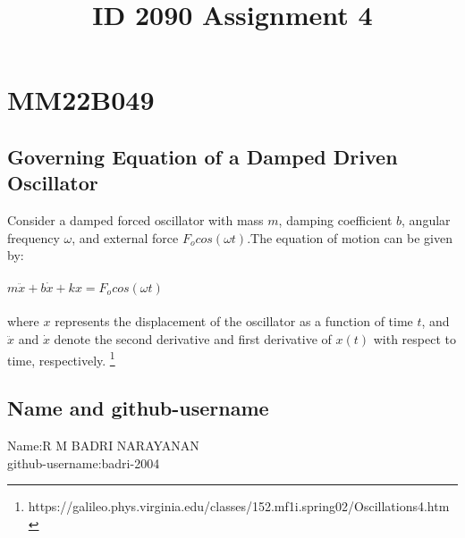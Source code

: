 \documentclass{article}
\title{ID 2090 Assignment 4}
\begin{document}
\section{MM22B049}
\subsection{Governing Equation of a Damped Driven Oscillator}
Consider a damped forced oscillator with mass $m$, damping coefficient $b$, angular frequency $\omega$, and external force \(F_ocos(\omega t)\).The equation of motion can be given by:\\\\
\textsc{\Large  \(m\ddot{x} + b\dot{x} + kx = F_ocos(\omega t)\)}\\\\

where $x$ represents the displacement of the oscillator as a function of time $t$, and $\ddot{x}$ and $\dot{x}$ denote the second derivative and first derivative of $x(t)$ with respect to time, respectively.
\footnote{https://galileo.phys.virginia.edu/classes/152.mf1i.spring02/Oscillations4.htm}
\subsection{Name and github-username }
Name:R M BADRI NARAYANAN\\
github-username:badri-2004
\end{document}
